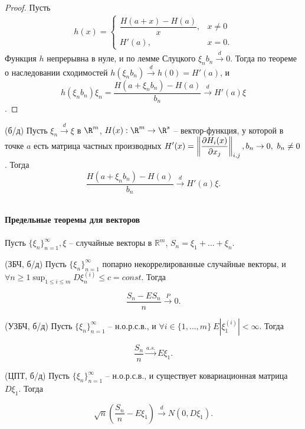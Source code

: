 \begin{proof}
	Пусть
	\begin{gather*}
	    h( x) =\begin{cases}
		\dfrac{H( a+x) -H( a)}{x}, & x\neq 0\\
		H'( a), & x=0.
	\end{cases}
	\end{gather*}
    Функция $h$ непрерывна в нуле, и по лемме Слуцкого $\xi_nb_n \xrightarrow{d} 0$. Тогда по теореме о наследовании сходимостей $\displaystyle h\left(\xi_nb_n\right) \xrightarrow{d} h\left(0\right) = H'(a)$, и
	\begin{equation*}
		h\left(\xi_nb_n\right)\xi_n = \frac{H(a + \xi_nb_n) - H(a)}{b_n} \xrightarrow{d} H'(a)\xi
	\end{equation*}.
\end{proof}
\begin{proposition}
	(б/д) Пусть $\xi_n \xrightarrow{d} \xi$ в $\R^m$, $H(x):\R^m \rightarrow \R^s$ -- вектор-функция, у которой в точке $a$ есть матрица частных производных $\displaystyle H'(x) = \left\Vert\frac{\partial H_i(x)}{\partial x_j}\right\Vert_{i,j},\\ b_n\rightarrow 0,\ b_n \ne 0$. Тогда
	\begin{equation*}
		\frac{H(a + \xi_nb_n) - H(a)}{b_n} \xrightarrow{d} H'(a)\xi.
	\end{equation*}
\end{proposition}
\\\textbf{Предельные теоремы для векторов}
\\
\\Пусть $\displaystyle \{\xi _{n}\}_{n=1}^{\infty } ,\xi $ -- случайные векторы в $\displaystyle \mathbb{R}^{m}$, $\displaystyle S_{n} =\xi _{1} +\dotsc +\xi _{n}$.
\begin{theorem}
	(ЗБЧ, б/д) Пусть $\displaystyle \{\xi _{n}\}_{n=1}^{\infty}$ попарно некоррелированные случайные векторы, и $\displaystyle \forall n \ge 1 \sup_{1\le i\le m} D\xi _{n}^{( i)} \leqslant c=const$. Тогда
	
	
	\begin{equation*}
		\frac{S_{n} -ES_{n}}{n}\xrightarrow{P} 0.
	\end{equation*}
\end{theorem}
\begin{theorem}
	(УЗБЧ, б/д) Пусть $\displaystyle \{\xi _{n}\}_{n=1}^{\infty }$ -- н.о.р.с.в., и $\displaystyle \forall i\in \{1,\dotsc ,m\} \ E\left| \xi _{1}^{( i)}\right| < \infty $. Тогда
	
	
	\begin{equation*}
		\frac{S_{n}}{n}\xrightarrow{a.s.} E\xi_{1} .
	\end{equation*}
\end{theorem}
\begin{theorem}
	(ЦПТ, б/д) Пусть $\displaystyle \{\xi _{n}\}_{n=1}^{\infty }$ -- н.о.р.с.в., и существует ковариационная матрица $\displaystyle D\xi _{1}$. Тогда
	
	
	\begin{equation*}
		\sqrt{n}\left(\frac{S_{n}}{n} -E\xi_{1}\right)\xrightarrow{d} N( 0,D\xi_{1}) .
	\end{equation*}
\end{theorem}